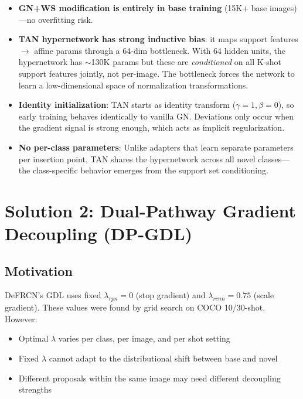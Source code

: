 \documentclass[11pt,a4paper]{article}
\begin{document}
\begin{itemize}[nosep]
    \item \textbf{GN+WS modification is entirely in base training} (15K+ base images)---no overfitting risk.
    \item \textbf{TAN hypernetwork has strong inductive bias}: it maps support features $\rightarrow$ affine params through a 64-dim bottleneck. With 64 hidden units, the hypernetwork has $\sim$130K params but these are \textit{conditioned} on all K-shot support features jointly, not per-image. The bottleneck forces the network to learn a low-dimensional space of normalization transformations.
    \item \textbf{Identity initialization}: TAN starts as identity transform ($\gamma=1, \beta=0$), so early training behaves identically to vanilla GN. Deviations only occur when the gradient signal is strong enough, which acts as implicit regularization.
    \item \textbf{No per-class parameters}: Unlike adapters that learn separate parameters per insertion point, TAN shares the hypernetwork across all novel classes---the class-specific behavior emerges from the support set conditioning.
\end{itemize}


\section{Solution 2: Dual-Pathway Gradient Decoupling (DP-GDL)}
\label{sec:dpgdl}

\subsection{Motivation}

DeFRCN's GDL uses fixed $\lambda_{rpn}=0$ (stop gradient) and $\lambda_{rcnn}=0.75$ (scale gradient). These values were found by grid search on COCO 10/30-shot. However:
\begin{itemize}[nosep]
    \item Optimal $\lambda$ varies per class, per image, and per shot setting
    \item Fixed $\lambda$ cannot adapt to the distributional shift between base and novel
    \item Different proposals within the same image may need different decoupling strengths
\end{itemize}
\end{document}
